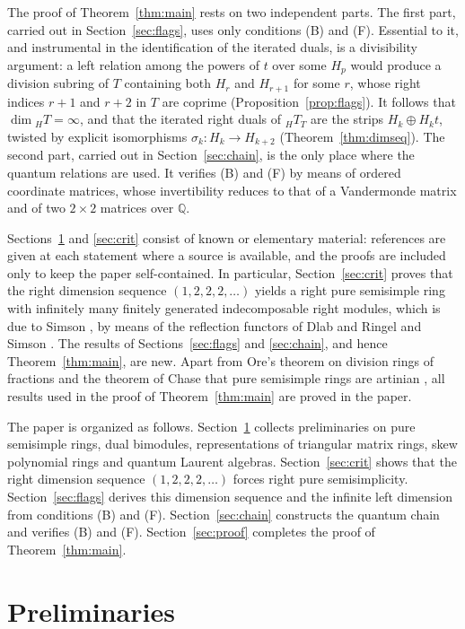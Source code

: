 \documentclass[11pt,a4paper]{amsart}
\numberwithin{equation}{section}
\newcommand{\Q}{\mathbb{Q}}
\begin{document}
The proof of Theorem~\ref{thm:main} rests on two independent parts. The first part, carried out in Section~\ref{sec:flags}, uses only conditions (B) and (F). Essential to it, and instrumental in the identification of the iterated duals, is a divisibility argument: a left relation among the powers of $t$ over some $H_p$ would produce a division subring of $T$ containing both $H_r$ and $H_{r+1}$ for some $r$, whose right indices $r+1$ and $r+2$ in $T$ are coprime (Proposition~\ref{prop:flags}). It follows that $\dim{}_HT=\infty$, and that the iterated right duals of ${}_HT_T$ are the strips $H_k\oplus H_kt$, twisted by explicit isomorphisms $\sigma_k\colon H_k\to H_{k+2}$ (Theorem~\ref{thm:dimseq}). The second part, carried out in Section~\ref{sec:chain}, is the only place where the quantum relations are used. It verifies (B) and (F) by means of ordered coordinate matrices, whose invertibility reduces to that of a Vandermonde matrix and of two $2\times2$ matrices over $\Q$.

Sections~\ref{sec:prelim} and \ref{sec:crit} consist of known or elementary material: references are given at each statement where a source is available, and the proofs are included only to keep the paper self-contained. In particular, Section~\ref{sec:crit} proves that the right dimension sequence $(1,2,2,2,\dots)$ yields a right pure semisimple ring with infinitely many finitely generated indecomposable right modules, which is due to Simson \cite{Si97}, by means of the reflection functors of Dlab and Ringel \cite{DR} and Simson \cite{Si81}. The results of Sections~\ref{sec:flags} and \ref{sec:chain}, and hence Theorem~\ref{thm:main}, are new. Apart from Ore's theorem on division rings of fractions \cite{Co,GW} and the theorem of Chase that pure semisimple rings are artinian \cite{Ch}, all results used in the proof of Theorem~\ref{thm:main} are proved in the paper.

The paper is organized as follows. Section~\ref{sec:prelim} collects preliminaries on pure semisimple rings, dual bimodules, representations of triangular matrix rings, skew polynomial rings and quantum Laurent algebras. Section~\ref{sec:crit} shows that the right dimension sequence $(1,2,2,2,\dots)$ forces right pure semisimplicity. Section~\ref{sec:flags} derives this dimension sequence and the infinite left dimension from conditions (B) and (F). Section~\ref{sec:chain} constructs the quantum chain and verifies (B) and (F). Section~\ref{sec:proof} completes the proof of Theorem~\ref{thm:main}.

\section{Preliminaries}\label{sec:prelim}
\end{document}
